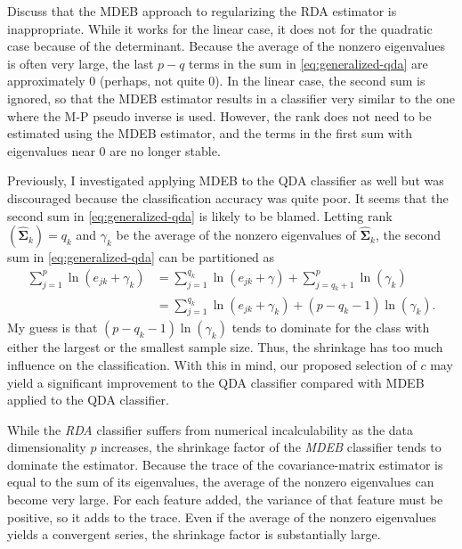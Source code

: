 \documentclass[11pt]{article}
\begin{document}
Discuss that the MDEB approach to regularizing the RDA estimator is inappropriate. While it works for the linear case, it does not for the quadratic case because of the determinant. Because the average of the nonzero eigenvalues is often very large, the last $p - q$ terms in the sum in \eqref{eq:generalized-qda} are approximately 0 (perhaps, not quite 0). In the linear case, the second sum is ignored, so that the MDEB estimator results in a classifier very similar to the one where the M-P pseudo inverse is used. However, the rank does not need to be estimated using the MDEB estimator, and the terms in the first sum with eigenvalues near 0 are no longer stable.

Previously, I investigated applying MDEB to the QDA classifier as well but was discouraged because the classification accuracy was quite poor. It seems that the second sum in \eqref{eq:generalized-qda} is likely to be blamed. Letting rank$(\widehat{\bm\Sigma}_k) = q_k$ and $\gamma_k$ be the average of the nonzero eigenvalues of $\widehat{\bm \Sigma}_k$, the second sum in \eqref{eq:generalized-qda} can be partitioned as
\begin{align*}
	\sum_{j=1}^p \ln (e_{jk} + \gamma_k) &= \sum_{j=1}^{q_k} \ln (e_{jk} + \gamma) + \sum_{j=q_k + 1}^p \ln (\gamma_k)\\
	&= \sum_{j=1}^{q_k} \ln (e_{jk} + \gamma_k) + (p - q_k - 1) \ln (\gamma_k).
\end{align*}
My guess is that $(p - q_k - 1) \ln (\gamma_k)$ tends to dominate for the class with either the largest or the smallest sample size. Thus, the shrinkage has too much influence on the classification. With this in mind, our proposed selection of $c$ may yield a significant improvement to the QDA classifier compared with MDEB applied to the QDA classifier.




While the \emph{RDA} classifier suffers from numerical incalculability as the data dimensionality $p$ increases, the shrinkage factor of the \emph{MDEB} classifier tends to dominate the estimator. Because the trace of the covariance-matrix estimator is equal to the sum of its eigenvalues, the average of the nonzero eigenvalues can become very large. For each feature added, the variance of that feature must be positive, so it adds to the trace.  Even if the average of the nonzero eigenvalues yields a convergent series, the shrinkage factor is substantially large.


	



\end{document}
